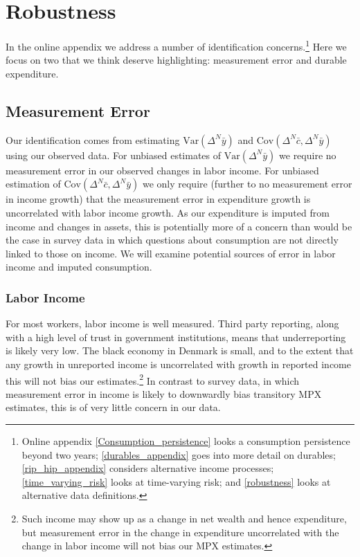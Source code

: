 \documentclass[titlepage]{\econtex}\newcommand{\texname}{ConsumptionHeterogeneity}
\begin{document}
	\section{Robustness}
	\label{threats_to_identification}
	In the online appendix we address a number of identification concerns.\footnote{Online appendix \ref{Consumption_persistence} looks a consumption persistence beyond two years; \ref{durables_appendix} goes into more detail on durables; \ref{rip_hip_appendix} considers alternative income processes; \ref{time_varying_risk} looks at time-varying risk; and \ref{robustness} looks at alternative data definitions.} Here we focus on two that we think deserve highlighting: measurement error and durable expenditure.
	
	\subsection{Measurement Error} \label{Measurement_error}
	Our identification comes from estimating $\mathrm{Var}(\Delta^N \bar{y})$ and $\mathrm{Cov}(\Delta^N \bar{c},\Delta^N \bar{y})$ using our observed data. For unbiased estimates of $\mathrm{Var}(\Delta^N \bar{y})$ we require no measurement error in our observed changes in labor income. For unbiased estimation of $\mathrm{Cov}(\Delta^N \bar{c},\Delta^N \bar{y})$ we only require (further to no measurement error in income growth) that the measurement error in expenditure growth is uncorrelated with labor income growth. As our expenditure is imputed from income and changes in assets, this is potentially more of a concern than would be the case in survey data in which questions about consumption are not directly linked to those on income. We will examine potential sources of error in labor income and imputed consumption.
	
	\subsubsection{Labor Income}
	For most workers, labor income is well measured. Third party reporting, along with a high level of trust in government institutions, means that underreporting is likely very low. The black economy in Denmark is small, and to the extent that any growth in unreported income is uncorrelated with growth in reported income this will not bias our estimates.\footnote{Such income may show up as a change in net wealth and hence expenditure, but measurement error in the change in expenditure uncorrelated with the change in labor income will not bias our MPX estimates.} In contrast to survey data, in which measurement error in income is likely to downwardly bias transitory MPX estimates, this is of very little concern in our data.
	
\end{document}
